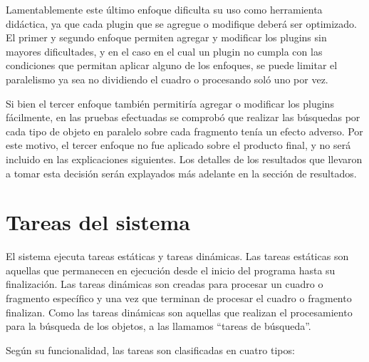 Lamentablemente este último enfoque dificulta su uso como herramienta didáctica,
ya que cada plugin que se agregue o modifique deberá ser optimizado. El primer y
segundo enfoque permiten agregar y modificar los plugins sin mayores
dificultades, y en el caso en el cual un plugin no cumpla con las condiciones
que permitan aplicar alguno de los enfoques, se puede limitar el paralelismo ya
sea no dividiendo el cuadro o procesando soló uno por vez.

Si bien el tercer enfoque también permitiría agregar o modificar los plugins
fácilmente, en las pruebas efectuadas se comprobó que realizar las búsquedas por
cada tipo de objeto en paralelo sobre cada fragmento tenía un efecto adverso.
Por este motivo, el tercer enfoque no fue aplicado sobre el producto final, y no
será incluido en las explicaciones siguientes. Los detalles de los resultados
que llevaron a tomar esta decisión serán explayados más adelante en la sección
de resultados.

\section{Tareas del sistema}

El sistema ejecuta tareas estáticas y tareas dinámicas. Las tareas estáticas son
aquellas que permanecen en ejecución desde el inicio del programa hasta su
finalización. Las tareas dinámicas son creadas para procesar un cuadro o
fragmento específico y una vez que terminan de procesar el cuadro o fragmento
finalizan. Como las tareas dinámicas son aquellas que realizan el procesamiento
para la búsqueda de los objetos, a las llamamos ``tareas de búsqueda''.

Según su funcionalidad, las tareas son clasificadas en cuatro tipos:

